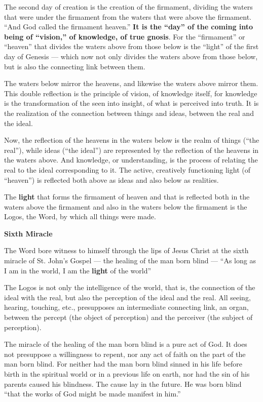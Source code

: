 The second day of creation is the creation of the firmament, dividing the waters that were under the firmament from the waters that were above the firmament. ``And God called the firmament heaven.'' \textbf{It is the ``day'' of the coming into being of ``vision,'' of knowledge, of true gnosis}. For the ``firmament'' or ``heaven'' that divides the waters above from those below is the ``light'' of the first day of Genesis — which now not only divides the waters above from those below, but is also the connecting link between them.

The waters below mirror the heavens, and likewise the waters above mirror them. This double reflection is the principle of vision, of knowledge itself, for knowledge is the transformation of the seen into insight, of what is perceived into truth. It is the realization of the connection between things and ideas, between the real and the ideal.

Now, the reflection of the heavens in the waters below is the realm of things (``the real''), while ideas (``the ideal'') are represented by the reflection of the heavens in the waters above. And knowledge, or understanding, is the process of relating the real to the ideal corresponding to it. The active, creatively functioning light (of ``heaven'') is reflected both above as ideas and also below as realities.

\begin{quotex}
The \textbf{light} that forms the firmament of heaven and that is reflected both in the waters above the firmament and also in the waters below the firmament is the Logos, the Word, by which all things were made.

\end{quotex}
\textbf{Sixth Miracle}

The Word bore witness to himself through the lips of Jesus Christ at the sixth miracle of St.
John's Gospel — the healing of the man born blind — ``As long as I am in the world, I am the \textbf{light} of the world''

The Logos is not only the intelligence of the world, that is, the connection of the ideal with the real, but also the perception of the ideal and the real. All seeing, hearing, touching, etc., presupposes an intermediate connecting link, an organ, between the percept (the object of perception) and the perceiver (the subject of perception).

The miracle of the healing of the man born blind is a pure act of God. It does not presuppose a willingness to repent, nor any act of faith on the part of the man born blind. For neither had the man born blind sinned in his life before birth in the spiritual world or in a previous life on earth, nor had the sin of his parents caused his blindness. The cause lay in the future. He was born blind ``that the works of God might be made manifest in him.''

